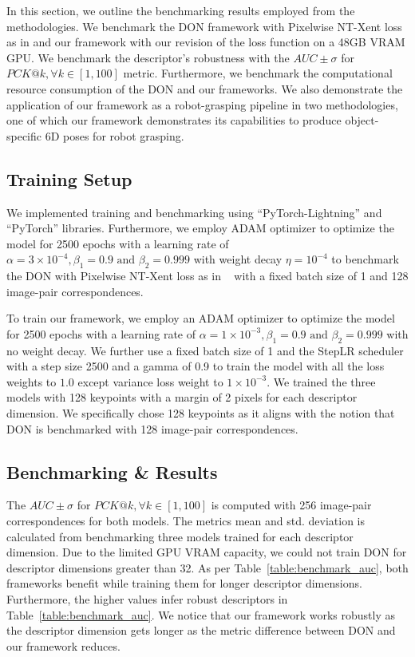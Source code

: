 In this section, we outline the benchmarking results employed from the methodologies.
We benchmark the DON framework with Pixelwise NT-Xent loss as in \cite{adrian2022efficient} and our framework
with our revision of the loss function on a 48GB VRAM GPU. We benchmark the descriptor's robustness
with the $AUC \pm \sigma$ for $PCK@k, \forall k \in [1, 100]$ metric.
Furthermore, we benchmark the computational resource consumption of the DON and our frameworks.
We also demonstrate the application of our framework as a robot-grasping pipeline in two methodologies,
one of which our framework demonstrates its capabilities to produce object-specific 6D poses for robot grasping.


\subsection{Training Setup}
We implemented training and benchmarking using ``PyTorch-Lightning''\cite{falcon2019pytorch} and ``PyTorch''\cite{paszke2019pytorch} libraries.
Furthermore, we employ
ADAM\cite{kingma2014adam} optimizer to optimize the model for 2500 epochs with a learning rate of
$\alpha = 3 \times 10^{-4}, \beta_1 = 0.9 \text{ and } \beta_2 = 0.999$ with weight decay $\eta =10^{-4}$ to benchmark the DON with Pixelwise NT-Xent loss as in ~\cite{adrian2022efficient}
with a fixed batch size of 1 and 128 image-pair correspondences.

To train our framework, we employ an ADAM optimizer to optimize the model for 2500 epochs with a learning rate of
$\alpha = 1 \times 10^{-3}, \beta_1 = 0.9 \text{ and } \beta_2 = 0.999$ with no weight decay.
We further use a fixed batch size of 1 and the StepLR scheduler with a step size 2500 and a gamma of 0.9 to train the model with all the loss weights to $1.0$ except variance loss weight to $1 \times 10^{-3}$.
We trained the three models with 128 keypoints with a margin of 2 pixels for each descriptor dimension. We specifically chose 128 keypoints as it aligns with the notion that DON is benchmarked with 128 image-pair correspondences.

\subsection{Benchmarking \& Results}
The $AUC \pm \sigma$ for $PCK@k, \forall k \in [1, 100]$ is computed with 256 image-pair correspondences for both models.
The metrics mean and std. deviation is calculated from benchmarking three models trained for each descriptor dimension.
Due to the limited GPU VRAM capacity, we could not train DON for descriptor dimensions greater than 32.
As per Table~\ref{table:benchmark_auc}, both frameworks benefit while training them for longer descriptor dimensions.
Furthermore, the higher values infer robust descriptors in Table~\ref{table:benchmark_auc}. We notice that our framework
works robustly as the descriptor dimension gets longer as the metric difference between DON and our framework reduces.

